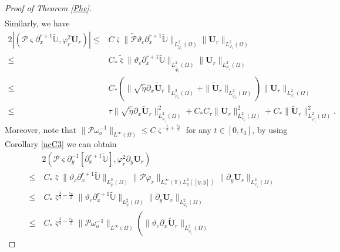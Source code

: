 \documentclass[10pt,a4paper]{amsart}
\begin{document}
\begin{proof}[Proof of Theorem \ref{Phe}]
\begin{align}
\end{align}
Similarly, we have
\begin{align}\label{J722}
2\left|(\mathcal{P}\varsigma\partial_{x}^{r+1}\tilde{\mathbb{U}},\varphi_{r}^{2}\mathbf{U}_{r})\right|
\leq& C\bar{\varsigma}\|\tilde{\mathcal{P}}\vartheta_{c}\partial_{x}^{r+1}\tilde{\mathbb{U}}\|_{L_{\tilde{\varphi}_{r}}^{2}(\Omega)}
             \|\mathbf{U}_{r}\|_{L_{\varphi_{r}}^{2}(\Omega)}\\
\leq& C_{*}\tilde{\bar{\varsigma}}\|\vartheta_{c}\partial_{x}^{r+1}\tilde{\mathbb{U}}\|_{L_{\tilde{\hat{\Psi}}_{r}}^{2}(\Omega)}
                 \|\mathbf{U}_{r}\|_{L_{\varphi_{r}}^{2}(\Omega)}\nonumber\\
\leq& C_{*}\left(\|\sqrt{\tilde{\eta}}\partial_{x}\tilde{\mathbf{U}}_{r}\|_{L_{\tilde{\varphi}_{r}}^{2}(\Omega)}
            +\|\tilde{\mathbf{U}}_{r}\|_{L_{\tilde{\varphi}_{r}}^{2}(\Omega)}\right)
      \|\mathbf{U}_{r}\|_{L_{\varphi_{r}}^{2}(\Omega)}\nonumber\\
\leq& \tau\|\sqrt{\tilde{\eta}}\partial_{x}\tilde{\mathbf{U}}_{r}\|_{L_{\tilde{\varphi}_{r}}^{2}(\Omega)}^{2}
     +C_{*}C_{\tau}\|\mathbf{U}_{r}\|_{L_{\varphi_{r}}^{2}(\Omega)}^{2}
     +C_{*}\|\tilde{\mathbf{U}}_{r}\|_{L_{\tilde{\varphi}_{r}}^{2}(\Omega)}^{2}.\nonumber
\end{align}
Moreover, note that $\|\mathcal{P}\omega_{o}^{-1}\|_{L^{\infty}(\Omega)}\leq C\bar{\varsigma}^{-\frac{1}{2}+\frac{\epsilon_{0}}{2}}$ for any $t\in[0,t_{3}]$, by using Corollary \ref{ncC3} we can obtain
\begin{align}\label{J723}
&2(\mathcal{P}\varsigma\partial_{y}^{-1}[\partial_{x}^{r+1}\tilde{\mathbb{U}}],\varphi_{r}^{2}\partial_{y}\mathbf{U}_{r})\\
\leq&~C_{*}\bar{\varsigma}\|\vartheta_{c}\partial_{x}^{r+1}\tilde{\mathbb{U}}\|_{L_{\check{\psi}}^{2}(\Omega)}
       \|\mathcal{P}\varphi_{r}\|_{L_{x}^{\infty}(\mathbb{T})L_{y}^{2}([\check{y},\hat{y}])}\|\partial_{y}\mathbf{U}_{r}\|_{L_{\varphi_{r}}^{2}(\Omega)}\nonumber\\
\leq&~C_{*}\bar{\varsigma}^{\frac{3}{4}-\frac{\varepsilon_{0}}{2}}\|\vartheta_{c}\partial_{x}^{r+1}\tilde{\mathbb{U}}\|_{L_{\check{\psi}}^{2}(\Omega)}
                               \|\partial_{y}\mathbf{U}_{r}\|_{L_{\varphi_{r}}^{2}(\Omega)}\nonumber\\
\leq&~C_{*}\bar{\varsigma}^{\frac{3}{4}-\frac{\varepsilon_{0}}{2}}\|\mathcal{P}\omega_{o}^{-1}\|_{L^{\infty}(\Omega)}
           \left(\|\vartheta_{c}\partial_{x}\tilde{\mathbf{U}}_{r}\|_{L_{\tilde{\varphi}_{r}}^{2}(\Omega)}

\end{align}
\end{proof}
\end{document}
